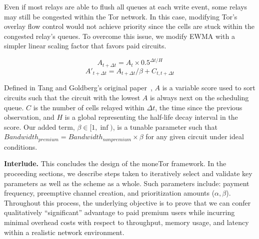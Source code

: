 Even if most relays are able to flush all queues at each write event, some
relays may still be congested within the Tor network. In this case, modifying
Tor's overlay flow control would not achieve priority since the cells are stuck
within the congested relay's queues. To overcome this issue, we modify EWMA with
a simpler linear scaling factor that favors paid circuits.

\begin{equation}
  A_{t + \Delta t} = A_t \times 0.5^{\Delta t/H}
\end{equation}
\begin{equation}
  A'_{t + \Delta t} = A_{t + \Delta t} / \beta + C_{t, t + \Delta t}
\end{equation}

Defined in Tang and Goldberg's original paper~\cite{tang2010improved}, $A$ is a
variable score used to sort circuits such that the circuit with the lowest $A$
is always next on the scheduling queue. $C$ is the number of cells relayed
within $\Delta t$, the time since the previous observation, and $H$ is a global
representing the half-life decay interval in the score. Our added term, $\beta
\in [1, \inf)$, is a tunable parameter such that $\mathit{Bandwidth}_{\mathit{premium}} =
  \mathit{Bandwidth}_{\mathit{nonpremium}} \times \beta$ for any given circuit under ideal
  conditions.


  \medskip
  \noindent \textbf{Interlude.}
  This concludes the design of the moneTor framework. In
the proceeding sections, we describe steps taken to iteratively select and
validate key parameters as well as the scheme as a whole. Such parameters
include: payment frequency, preemptive channel creation, and prioritization
amounts ($\alpha, \beta$). Throughout this process, the underlying objective is
to prove that we can confer qualitatively ``significant'' advantage to paid
premium users while incurring minimal overhead costs with respect to throughput,
memory usage, and latency within a realistic network environment.


